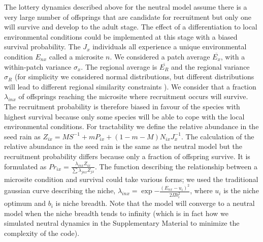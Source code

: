 \documentclass[12pt]{article}
\begin{document}
The lottery dynamics described above for the neutral model assume there is a
very large number of offsprings that are candidate for recruitment but only one
will survive and develop to the adult stage. The effect of a differentiation to
local environmental conditions could be implemented at this stage with a biased 
survival probability. The $J_x$ individuals all experience a unique environmental condition 
$E_{nx}$ called a microsite $n$. We considered a patch average $\overline{E_x}$, with a
within-patch variance $\sigma_x$. The regional average is $\overline{E_R}$ and
the regional variance $\sigma_R$ (for simplicity we considered normal
distributions, but different distributions will lead to different regional
similarity constraints \parencite{Mouquet2003,Tilman2004,Gravel2006}). We
consider that a fraction $\lambda_{inx}$ of offsprings reaching the microsite
where recruitment occurs will survive. The recruitment probability is therefore
biased in favour of the species with highest survival because only some species will be able to cope with the local environmental conditions. For tractability we define the relative abundance in
the seed rain as $Z_{ix} = MS^{-1} + mP_{ix} + (1-m-M)N_{ix}J_x^{-1}$. The
calculation of the relative abundance in the seed rain is the same as the
neutral model but the recruitment probability differs because only a fraction of
offspring survive. It is formulated as $Pr_{ix} =
\frac{\lambda_{inx}Z_{ix}}{\sum \lambda_{jnx}Z_{jx}}$. The function describing
the relationship between a microsite condition and survival could take various
forms; we used the traditional gaussian curve describing the niche,
$\lambda_{inx} =  \exp{-\frac{(E_{nx}-u_i)^2}{2\Pi b_i^2}}$, where $u_i$ is the
niche optimum and $b_i$ is niche breadth. Note that the model will converge to a
neutral model when the niche breadth tends to infinity (which is in fact how we
simulated neutral dynamics in the Supplementary Material to minimize the
complexity of the code). 
\end{document}
